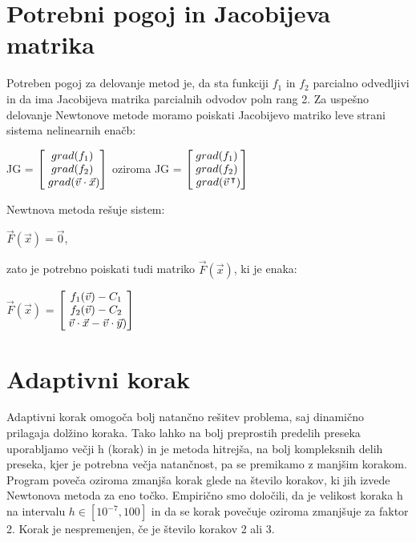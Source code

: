 \documentclass[12pt]{article}
\begin{document}
\newpage	
\section{Potrebni pogoj in Jacobijeva matrika}
	Potreben pogoj za delovanje metod je, da sta funkciji $f_{1}$ in $f_{2}$ parcialno odvedljivi in da ima Jacobijeva matrika parcialnih odvodov poln rang 2. Za uspešno delovanje Newtonove metode moramo poiskati Jacobijevo matriko leve strani sistema nelinearnih enačb:

	\begin{center}
		JG = $\begin{bmatrix}
		grad(f_{1}) \\
		grad(f_{2}) \\
		\hspace{1mm}grad(\vec{v} \cdot \vec{x}) \\
		\end{bmatrix}$
		oziroma
		JG = $\begin{bmatrix}
		grad(f_{1}) \\
		grad(f_{2}) \\
		\hspace{1mm}grad(\vec{v}\hspace{0.5mm}^\intercal) \\
		\end{bmatrix}$
	\end{center}
	Newtnova metoda rešuje sistem:
	\begin{center}
	    $\vec{F}(\vec{x}) = \vec{0}$,
	\end{center}
	zato je potrebno poiskati tudi matriko $\vec{F}(\vec{x})$, ki je enaka:
		\begin{center}
		$\vec{F}(\vec{x})$ = $\begin{bmatrix}
		f_{1}(\vec{v}) - C_{1} \\
		f_{2}(\vec{v}) - C_{2} \\
		\hspace{1mm}\vec{v} \cdot \vec{x} - \vec{v} \cdot \vec{y}) \\
		\end{bmatrix}$
	\end{center}

\section{Adaptivni korak}
    Adaptivni korak omogoča bolj natančno rešitev problema, saj dinamično prilagaja dolžino koraka. Tako lahko na bolj preprostih predelih preseka uporabljamo večji h (korak) in je metoda hitrejša, na bolj kompleksnih delih preseka, kjer je potrebna večja natančnost, pa se premikamo z manjšim korakom. Program poveča oziroma zmanjša korak glede na število korakov, ki jih izvede Newtonova metoda za eno točko. Empirično smo določili, da je velikost koraka h na intervalu $h\in[10^{-7},100]$ in da se korak povečuje oziroma zmanjšuje za faktor 2. Korak je nespremenjen, če je število korakov 2 ali 3.
	
\end{document}
